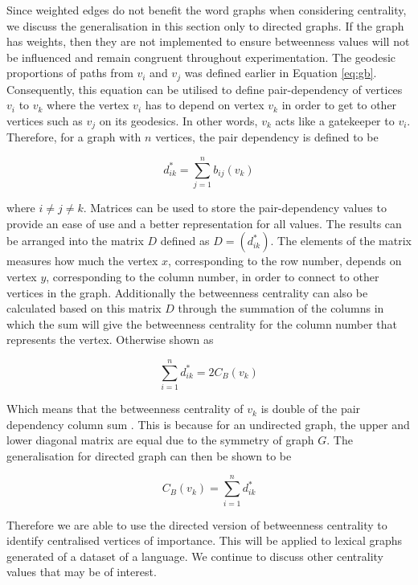 Since weighted edges do not benefit the word graphs when considering centrality, we discuss the generalisation in this section only to directed graphs. If the graph has weights, then they are not implemented to ensure betweenness values will not be influenced and remain congruent throughout experimentation. The geodesic proportions of paths from $v_i$ and $v_j$ was defined earlier in Equation \ref{eq:gb}. Consequently, this equation can be utilised to define pair-dependency of vertices $v_i$ to $v_k$ where the vertex $v_i$ has to depend on vertex $v_k$ in order to get to other vertices such as $v_j$ on its geodesics. In other words, $v_k$ acts like a gatekeeper to $v_i$. Therefore, for a graph with $n$ vertices, the pair dependency is defined to be 

\begin{equation}\label{eq:bcrmv}
d^*_{ik} = \sum_{j=1}^{n}b_{ij}(v_k)
\end{equation}

where $i \ne j \ne k$. Matrices can be used to store the pair-dependency values to provide an ease of use and a better representation for all values. The results can be arranged into the matrix $D$ defined as $D = (d^*_{ik})$. The elements of the matrix measures how much the vertex $x$, corresponding to the row number, depends on vertex $y$, corresponding to the column number, in order to connect to other vertices in the graph. Additionally the betweenness centrality can also be calculated based on this matrix $D$ through the summation of the columns in which the sum will give the betweenness centrality for the column number that represents the vertex. Otherwise shown as

\begin{equation}
\sum_{i=1}^nd^*_{ik} = 2C_B(v_k)
\end{equation}

Which means that the betweenness centrality of $v_k$ is double of the pair dependency column sum \cite{white1994betweenness}. This is because for an undirected graph, the upper and lower diagonal matrix are equal due to the symmetry of graph $G$. The generalisation for directed graph can then be shown to be

\begin{equation}
C_B(v_k) = \sum_{i=1}^nd^*_{ik}
\end{equation}

Therefore we are able to use the directed version of betweenness centrality to identify centralised vertices of importance. This will be applied to lexical graphs generated of a dataset of a language. We continue to discuss other centrality values that may be of interest.

